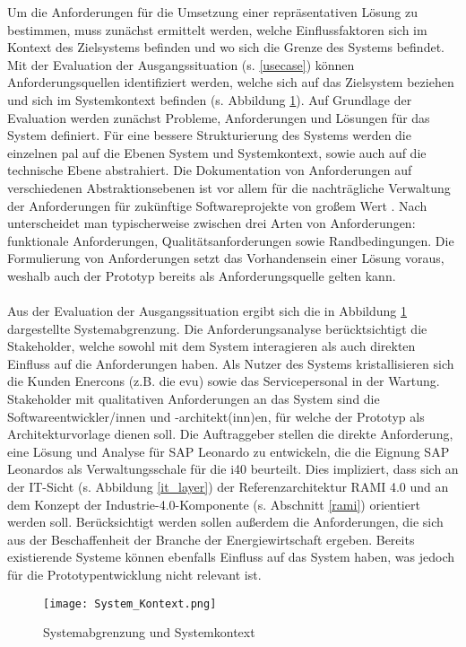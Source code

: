 Um die Anforderungen für die Umsetzung einer repräsentativen Lösung zu bestimmen, muss zunächst ermittelt werden, welche Einflussfaktoren sich im Kontext des Zielsystems befinden und wo sich die Grenze des Systems befindet. Mit der Evaluation der Ausgangssituation (s. \ref{usecase}) können Anforderungsquellen identifiziert werden, welche sich auf das Zielsystem beziehen und sich im Systemkontext befinden (s. Abbildung \ref{kontext}). Auf Grundlage der Evaluation werden zunächst Probleme, Anforderungen und Lösungen für das System definiert. Für eine bessere Strukturierung des Systems werden die einzelnen \ac{pal} auf die Ebenen System und Systemkontext, sowie auch auf die technische Ebene abstrahiert. Die Dokumentation von Anforderungen auf verschiedenen Abstraktionsebenen ist vor allem für die nachträgliche Verwaltung der Anforderungen für zukünftige Softwareprojekte von großem Wert \citep{Lauenroth2016}. Nach \citet{IREB2017} unterscheidet man typischerweise zwischen drei Arten von Anforderungen: funktionale Anforderungen, Qualitätsanforderungen sowie Randbedingungen.
Die Formulierung von Anforderungen setzt das Vorhandensein einer Lösung voraus, weshalb auch der Prototyp bereits als Anforderungsquelle gelten kann.
\\\\Aus der Evaluation der Ausgangssituation ergibt sich die in Abbildung \ref{kontext} dargestellte Systemabgrenzung. Die Anforderungsanalyse berücktsichtigt die Stakeholder, welche sowohl mit dem System interagieren als auch direkten Einfluss auf die Anforderungen haben. Als Nutzer des Systems kristallisieren sich die Kunden Enercons (z.B. die \ac{evu}) sowie das Servicepersonal in der Wartung. Stakeholder mit qualitativen Anforderungen an das System sind die Softwareentwickler/innen und -architekt(inn)en, für welche der Prototyp als Architekturvorlage dienen soll. Die Auftraggeber stellen die direkte Anforderung, eine Lösung und Analyse für SAP Leonardo zu entwickeln, die die Eignung SAP Leonardos als Verwaltungsschale für die \ac{i40} beurteilt. Dies impliziert, dass sich an der IT-Sicht (s. Abbildung \ref{it_layer}) der Referenzarchitektur RAMI 4.0 und an dem Konzept der Industrie-4.0-Komponente (s. Abschnitt \ref{rami}) orientiert werden soll. Berücksichtigt werden sollen außerdem die Anforderungen, die sich aus der Beschaffenheit der Branche der Energiewirtschaft ergeben. Bereits existierende Systeme können ebenfalls Einfluss auf das System haben, was jedoch für die Prototypentwicklung nicht relevant ist.


\begin{figure}[h]
  \centering
  \texttt{[image: System\_Kontext.png]}
  \caption[Systemabgrenzung und Systemkontext]{Systemabgrenzung und Systemkontext}
  \label{kontext}
\end{figure}

